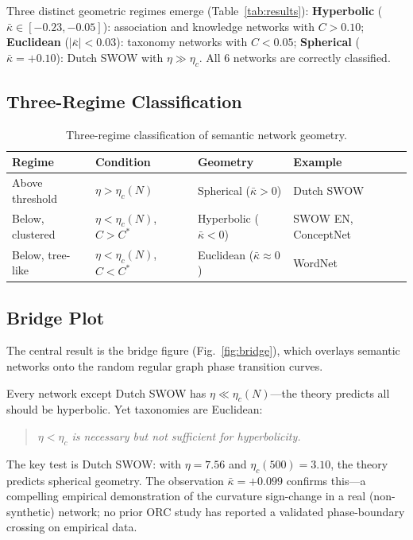\documentclass[11pt,a4paper]{article}
\newcommand{\kbar}{\bar{\kappa}}
\newcommand{\etac}{\eta_c}
\newcommand{\Cstar}{C^*}
\begin{document}
Three distinct geometric regimes emerge (Table~\ref{tab:results}): \textbf{Hyperbolic} ($\kbar \in [-0.23, -0.05]$): association and knowledge networks with $C > 0.10$; \textbf{Euclidean} ($|\kbar| < 0.03$): taxonomy networks with $C < 0.05$; \textbf{Spherical} ($\kbar = +0.10$): Dutch SWOW with $\eta \gg \etac$. All 6 networks are correctly classified.

\subsection{Three-Regime Classification}

\begin{table}[t]
\centering
\caption{Three-regime classification of semantic network geometry.}
\label{tab:regimes}
\begin{tabular}{@{}llll@{}}
\toprule
Regime & Condition & Geometry & Example \\
\midrule
Above threshold & $\eta > \etac(N)$ & Spherical ($\kbar > 0$) & Dutch SWOW \\
Below, clustered & $\eta < \etac(N)$, $C > \Cstar$ & Hyperbolic ($\kbar < 0$) & SWOW EN, ConceptNet \\
Below, tree-like & $\eta < \etac(N)$, $C < \Cstar$ & Euclidean ($\kbar \approx 0$) & WordNet \\
\bottomrule
\end{tabular}
\end{table}

\subsection{Bridge Plot}

The central result is the bridge figure (Fig.~\ref{fig:bridge}), which overlays semantic networks onto the random regular graph phase transition curves.

Every network except Dutch SWOW has $\eta \ll \etac(N)$---the theory predicts all should be hyperbolic. Yet taxonomies are Euclidean:

\begin{quote}
\emph{$\eta < \etac$ is necessary but not sufficient for hyperbolicity.}
\end{quote}

The key test is Dutch SWOW: with $\eta = 7.56$ and $\etac(500) = 3.10$, the theory predicts spherical geometry. The observation $\kbar = +0.099$ confirms this---a compelling empirical demonstration of the curvature sign-change in a real (non-synthetic) network; no prior ORC study has reported a validated phase-boundary crossing on empirical data.
\end{document}
